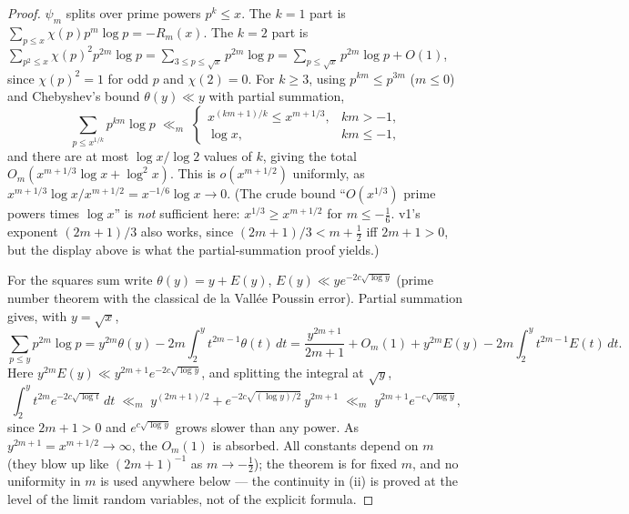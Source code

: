 \begin{proof}
$\psi_m$ splits over prime powers $p^k\le x$. The $k=1$ part is
$\sum_{p\le x}\chi(p)p^m\log p=-R_m(x)$. The $k=2$ part is
$\sum_{p^2\le x}\chi(p)^2p^{2m}\log p=\sum_{3\le p\le\sqrt x}p^{2m}\log p
=\sum_{p\le\sqrt x}p^{2m}\log p+O(1)$, since $\chi(p)^2=1$ for odd $p$
and $\chi(2)=0$. For $k\ge3$, using $p^{km}\le p^{3m}$ ($m\le0$) and
Chebyshev's bound $\theta(y)\ll y$ with partial summation,
\[
\sum_{p\le x^{1/k}}p^{km}\log p\;\ll_m\;
\begin{cases}
x^{(km+1)/k}\le x^{m+1/3}, & km>-1,\\
\log x, & km\le-1,
\end{cases}
\]
and there are at most $\log x/\log2$ values of $k$, giving the total
$O_m(x^{m+1/3}\log x+\log^2x)$. This is $o(x^{m+1/2})$ uniformly, as
$x^{m+1/3}\log x/x^{m+1/2}=x^{-1/6}\log x\to0$. (The crude bound
``$O(x^{1/3})$ prime powers times $\log x$'' is \emph{not} sufficient
here: $x^{1/3}\ge x^{m+1/2}$ for $m\le-\tfrac16$. v1's exponent
$(2m+1)/3$ also works, since $(2m+1)/3<m+\tfrac12$ iff $2m+1>0$, but
the display above is what the partial-summation proof yields.)

For the squares sum write $\theta(y)=y+E(y)$,
$E(y)\ll ye^{-2c\sqrt{\log y}}$ (prime number theorem with the
classical de la Vall\'ee Poussin error). Partial summation gives, with
$y=\sqrt x$,
\[
\sum_{p\le y}p^{2m}\log p
=y^{2m}\theta(y)-2m\int_2^y t^{2m-1}\theta(t)\,dt
=\frac{y^{2m+1}}{2m+1}+O_m(1)
+y^{2m}E(y)-2m\int_2^y t^{2m-1}E(t)\,dt .
\]
Here $y^{2m}E(y)\ll y^{2m+1}e^{-2c\sqrt{\log y}}$, and splitting the
integral at $\sqrt y$,
\[
\int_2^y t^{2m}e^{-2c\sqrt{\log t}}\,dt
\;\ll_m\; y^{(2m+1)/2}+e^{-2c\sqrt{(\log y)/2}}\,y^{2m+1}
\;\ll_m\; y^{2m+1}e^{-c\sqrt{\log y}} ,
\]
since $2m+1>0$ and $e^{c\sqrt{\log y}}$ grows slower than any power.
As $y^{2m+1}=x^{m+1/2}\to\infty$, the $O_m(1)$ is absorbed. All
constants depend on $m$ (they blow up like $(2m+1)^{-1}$ as
$m\to-\tfrac12$); the theorem is for fixed $m$, and no uniformity in
$m$ is used anywhere below --- the continuity in (ii) is proved at the
level of the limit random variables, not of the explicit formula.
\end{proof}

